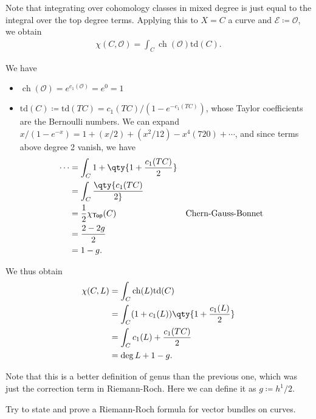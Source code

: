 \begin{remark}

Note that integrating over cohomology classes in mixed degree is just
equal to the integral over the top degree terms. Applying this to
\(X = C\) a curve and \(\mathcal{E} \coloneqq{\mathcal{O}}\), we obtain
\begin{align*}
\chi(C, {\mathcal{O}}) 
= \int_C \operatorname{ch}( {\mathcal{O}}) \mathrm{td}(C)
.\end{align*}

We have

\begin{itemize}
\item
  \(\operatorname{ch}({\mathcal{O}}) = e^{c_1({\mathcal{O}})} = e^0 = 1\)
\item
  \(\mathrm{td}(C) \coloneqq\mathrm{td}(TC) = c_1(TC) / (1- e^{ - c_1(TC) } )\),
  whose Taylor coefficients are the Bernoulli numbers. We can expand
  \(x/(1 -e^{-x}) = 1 + (x/2) + (x^2/12) - x^4(720) + \cdots\), and
  since terms above degree 2 vanish, we have
  \begin{align*}
  \cdots 
  &= \int_C 1 + \qty{ 1 + {c_1(TC) \over 2} } \\
  &= \int_C \qty{c_1(TC) \over 2 }\\
  &= {1\over 2} \chi_{\mathsf{Top}}(C) && \text{Chern-Gauss-Bonnet} \\
  &= {2-2g \over 2} \\
  &= 1-g
  .\end{align*}
\end{itemize}

We thus obtain
\begin{align*}
\chi(C, L) 
&= \int_C \operatorname{ch}(L) \mathrm{td}(C) \\
&= \int_C (1 + c_1(L) ) \qty {1 + {c_1(L) \over 2} }\\
&= \int_C c_1(L) + {c_1(TC) \over 2} \\
&= \deg L + 1-g
.\end{align*}

\end{remark}

\begin{remark}

Note that this is a better definition of genus than the previous one,
which was just the correction term in Riemann-Roch. Here we can define
it as \(g \coloneqq h^1/2\).

\end{remark}

\begin{exercise}[?]

Try to state and prove a Riemann-Roch formula for vector bundles on
curves.

\end{exercise}

